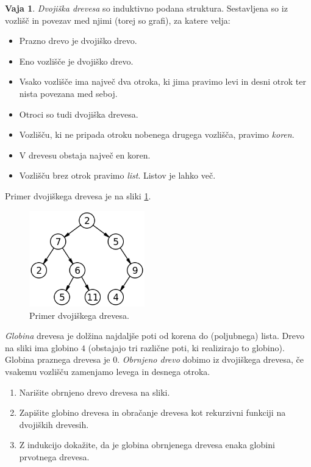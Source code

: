 \documentclass{article}
\theoremstyle{definition}
\newtheorem{vaja}{Vaja}
\begin{document}
\begin{vaja}
	\emph{Dvojiška drevesa} so induktivno podana struktura. Sestavljena so iz vozlišč in povezav med njimi (torej so grafi), za katere velja:
	\begin{itemize}
		\item Prazno drevo je dvojiško drevo.
		\item Eno vozlišče je dvojiško drevo.
		\item Vsako vozlišče ima največ dva otroka, ki jima pravimo levi in desni otrok ter nista povezana med seboj.
		\item Otroci so tudi dvojiška drevesa.
		\item Vozlišču, ki ne pripada otroku nobenega drugega vozlišča, pravimo \emph{koren}.
		\item V drevesu obstaja največ en koren.
		\item Vozlišču brez otrok pravimo \emph{list}. Listov je lahko več.
	\end{itemize}
	Primer dvojiškega drevesa je na sliki \ref{fig:drevo}.
	\begin{figure}[!ht]
		\centering
		\includegraphics[width = 5cm]{Binary_tree.png}
		\caption{Primer dvojiškega drevesa.}
		\label{fig:drevo}
	\end{figure}
	
	\emph{Globina} drevesa je dolžina najdaljše poti od korena do (poljubnega) lista. Drevo na sliki ima globino $4$ (obstajajo tri različne poti, ki realizirajo to globino). Globina praznega drevesa je 0.  
	\emph{Obrnjeno drevo} dobimo iz dvojiškega drevesa, če vsakemu vozlišču zamenjamo levega in desnega otroka. 
	\begin{enumerate}
		\item Narišite obrnjeno drevo drevesa na sliki.
		\item Zapišite globino drevesa in obračanje drevesa kot rekurzivni funkciji na dvojiških drevesih.
		\item Z indukcijo dokažite, da je globina obrnjenega drevesa enaka globini prvotnega drevesa. 
	\end{enumerate}
\end{vaja}
\end{document}
